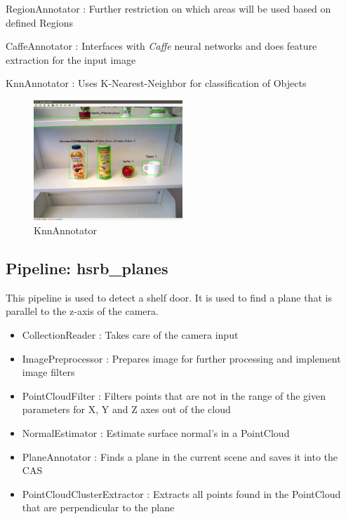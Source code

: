 \documentclass[main.tex]{subfiles}
\begin{document}
\begin{itemize}
    \item RegionAnnotator : Further restriction on which areas will be used based on defined Regions 
    \item CaffeAnnotator : Interfaces with \textit{Caffe} neural networks and does feature extraction for the input image

    \begin{minipage}[t]{\textwidth}
    \item KnnAnnotator : Uses K-Nearest-Neighbor for classification of Objects 
        \begin{figure}[H]
                \centering
                 \includegraphics[width=0.5\textwidth]{pictures/2d/KnnAnnotator.png}
                \caption{KnnAnnotator}
          \end{figure}
    \end{minipage}
\end{itemize}



            \subsection{Pipeline: hsrb\_planes} 
This pipeline is used to detect a shelf door. It is used to find a plane that is parallel to the z-axis of the camera.
\begin{itemize}
    \item CollectionReader : Takes care of the camera input
    \item ImagePreprocessor : Prepares image for further processing and implement image filters  
    \item PointCloudFilter : Filters points that are not in the range of the given parameters for X, Y and Z axes out of the cloud
    \item NormalEstimator : Estimate surface normal's in a PointCloud 
    \item PlaneAnnotator : Finds a plane in the current scene and saves it into the CAS
    \item PointCloudClusterExtractor : Extracts all points found in the PointCloud that are perpendicular to the plane 
\end{itemize}
\end{document}
